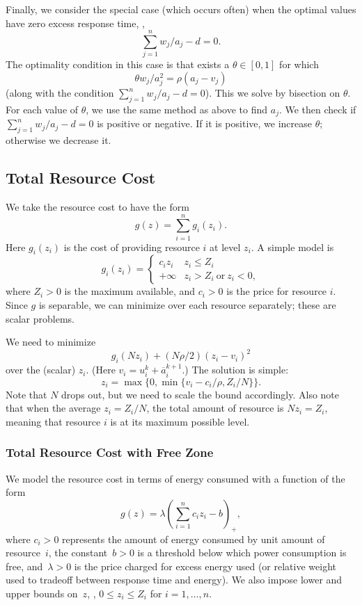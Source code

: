 Finally, we consider the special case (which occurs often) when
the optimal values have zero excess response time, \ie,
\[
\sum_{j=1}^n w_j/a_j - d  = 0.
\]
The optimality condition in this case is that exists a $\theta \in [0,1]$
for which
\[
\theta w_j/a_j^2 = \rho(a_j - v_j)
\]
(along with the condition $\sum_{j=1}^n w_j/a_j - d  = 0$).
This we solve by bisection on $\theta$.  For each value of $\theta$,
we use the same method as above to find $a_j$.  We then check if
$\sum_{j=1}^n w_j/a_j - d  = 0$ is positive or negative.
If it is positive, we increase $\theta$; otherwise we decrease it.

\subsection{Total Resource Cost}

We take the resource cost to have the form
\[
g(z) = \sum_{i=1}^n g_i(z_i).
\]
Here $g_i(z_i)$ is the cost of providing resource $i$ at level $z_i$.
A simple model is 
\[
g_i(z_i) = \left\{ \begin{array}{ll} 
c_i z_i & z_i \leq Z_i\\
+ \infty & z_i > Z_i ~\mbox{or}~z_i<0,
\end{array} \right.
\]
where $Z_i>0$ is the maximum available, and $c_i>0$ is the price for
resource $i$.
Since $g$ is separable, we can minimize over each resource 
separately; these are scalar problems.

We need to minimize 
\[
g_i(Nz_i)  +(N\rho/2)(z_i - v_i)^2
\]
over the (scalar) $z_i$. (Here $v_i = u^k_i + \overline a^{k+1}_i$.)
The solution is simple:
\[
    z_i = \max \{0, \min \{ v_i - c_i/\rho, Z_i/N\} \}.
\]
Note that $N$ drops out, but we need to scale the bound accordingly.
Also note that when the average $z_i = Z_i/N$, the total amount of
resource is $N z_i=Z_i$, meaning 
that resource $i$ is at its maximum possible level.

\subsubsection{Total Resource Cost with Free Zone}
We model the resource cost in terms of energy consumed with a function 
of the form
\[
    g(z) = \lambda \left(\sum_{i=1}^n c_i z_i - b\right)_+,
\]
where $c_i>0$ represents the amount of energy consumed by
unit amount of resource~$i$, 
the constant~$b>0$ is a threshold below which power consumption is free,
and~$\lambda>0$ is the price charged for excess energy used
(or relative weight used to tradeoff between response time and energy).
We also impose lower and upper bounds on~$z$, \ie, $0\leq z_i\leq Z_i$
for $i=1,\ldots, n$.

